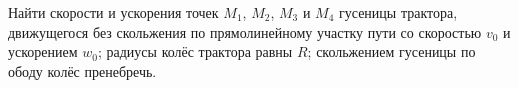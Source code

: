 Найти скорости и ускорения точек $M_1$, $M_2$, $M_3$ и $M_4$
гусеницы трактора, движущегося без скольжения
по прямолинейному участку пути со скоростью $v_0$ и ускорением $w_0$;
радиусы колёс трактора равны $R$;
скольжением гусеницы по ободу колёс пренебречь.
